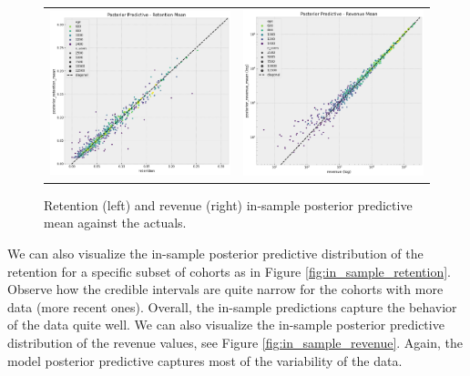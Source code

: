 \documentclass[11pt]{amsart}
\theoremstyle{definition}
\begin{document}
\begin{figure}
    \centering
    \begin{tabular}{cc}
        \includegraphics[width=0.5 \textwidth]{images/revenue_retention_45_0.png} & 
        \includegraphics[width=0.5 \textwidth]{images/revenue_retention_47_0.png}
    \end{tabular}
    \caption{Retention (left) and revenue (right) in-sample posterior predictive mean
    against the actuals.}
    \label{fig:in_sample_mean}
\end{figure}

We can also visualize the in-sample posterior predictive distribution of the retention
for a specific subset of cohorts as in Figure \ref{fig:in_sample_retention}. Observe
how the credible intervals are quite narrow for the cohorts with more data (more recent
ones). Overall, the in-sample predictions capture the behavior of the data quite well.
We can also visualize the in-sample posterior predictive distribution of the revenue
values, see Figure \ref{fig:in_sample_revenue}. Again, the model posterior predictive 
captures most of the variability of the data.
\end{document}
